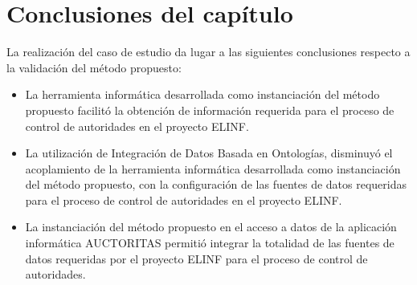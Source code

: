 \section{Conclusiones del capítulo}

La realización del caso de estudio da lugar a las siguientes conclusiones respecto a la validación del método propuesto:

\begin{itemize}
\item La herramienta informática desarrollada como instanciación del método propuesto facilitó la obtención de información requerida para el proceso de  control de autoridades en el proyecto ELINF.
\item La utilización de Integración de Datos Basada en Ontologías, disminuyó el acoplamiento de la herramienta informática desarrollada como instanciación del método propuesto, con la configuración de las fuentes de datos requeridas para el proceso de  control de autoridades en el proyecto ELINF.
\item La instanciación del método propuesto en el acceso a datos de la aplicación informática AUCTORITAS permitió integrar la totalidad de las fuentes de datos requeridas por el proyecto ELINF para el proceso de  control de autoridades.
\end{itemize}